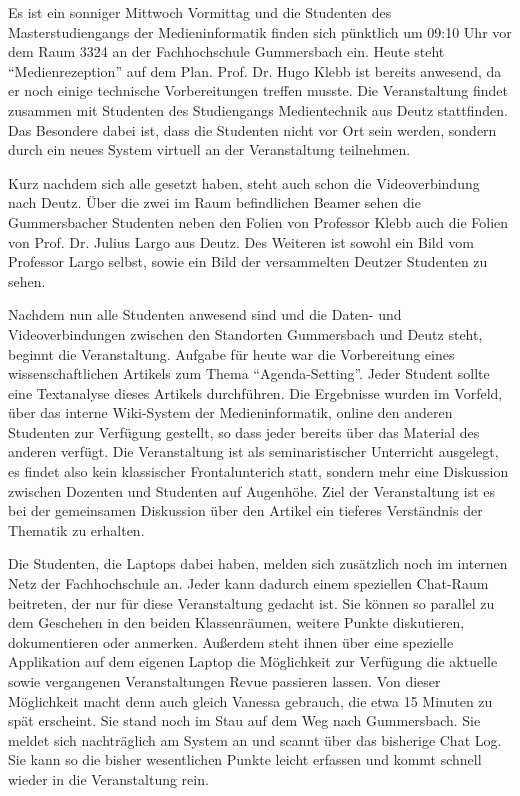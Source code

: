   \begin{kasten}
    \label{msec:narrative_beschreibung_der_situation}
    
      Es ist ein sonniger Mittwoch Vormittag und die Studenten des Masterstudiengangs der Medieninformatik finden sich pünktlich um 09:10 Uhr vor dem Raum 3324 an der Fachhochschule Gummersbach ein. Heute steht "`Medienrezeption"' auf dem Plan. Prof. Dr. Hugo Klebb ist bereits anwesend, da er noch einige technische Vorbereitungen treffen musste. Die Veranstaltung  findet zusammen mit Studenten des Studiengangs Medientechnik aus Deutz stattfinden. Das Besondere dabei ist, dass die Studenten nicht vor Ort sein werden, sondern durch ein neues System virtuell an der Veranstaltung teilnehmen.

      Kurz nachdem sich alle gesetzt haben, steht auch schon die Videoverbindung nach Deutz. Über die zwei im Raum befindlichen Beamer sehen die Gummersbacher Studenten neben den Folien von Professor Klebb auch die Folien von Prof. Dr. Julius Largo aus Deutz. Des Weiteren ist sowohl ein Bild vom Professor Largo selbst, sowie ein Bild der versammelten Deutzer Studenten zu sehen.
  
      Nachdem nun alle Studenten anwesend sind und die Daten- und Videoverbindungen zwischen den Standorten Gummersbach und Deutz steht, beginnt die Veranstaltung. Aufgabe für heute war die Vorbereitung eines wissenschaftlichen Artikels zum Thema "`Agenda-Setting"'. Jeder Student sollte eine Textanalyse dieses Artikels durchführen. Die Ergebnisse wurden im Vorfeld, über das interne Wiki-System der Medieninformatik, online den anderen Studenten zur Verfügung gestellt, so dass jeder bereits über das Material des anderen verfügt. Die Veranstaltung ist als seminaristischer Unterricht ausgelegt, es findet also kein klassischer Frontalunterich statt, sondern mehr eine Diskussion zwischen Dozenten und Studenten auf Augenhöhe. Ziel der Veranstaltung ist es bei der gemeinsamen Diskussion über den Artikel ein tieferes Verständnis der Thematik zu erhalten.

      Die Studenten, die Laptops dabei haben, melden sich zusätzlich noch im internen Netz der Fachhochschule an. Jeder kann dadurch einem speziellen Chat-Raum beitreten, der nur für diese Veranstaltung gedacht ist. Sie können so parallel zu dem Geschehen in den beiden Klassenräumen, weitere Punkte diskutieren, dokumentieren oder anmerken. Außerdem steht ihnen über eine spezielle Applikation auf dem eigenen Laptop die Möglichkeit zur Verfügung die aktuelle sowie vergangenen Veranstaltungen Revue passieren lassen. Von dieser Möglichkeit macht denn auch gleich Vanessa gebrauch, die etwa 15 Minuten zu spät erscheint. Sie stand noch im Stau auf dem Weg nach Gummersbach. Sie meldet sich nachträglich am System an und scannt über das bisherige Chat Log. Sie kann so die bisher wesentlichen Punkte leicht erfassen und kommt schnell wieder in die Veranstaltung rein.


\end{kasten}
